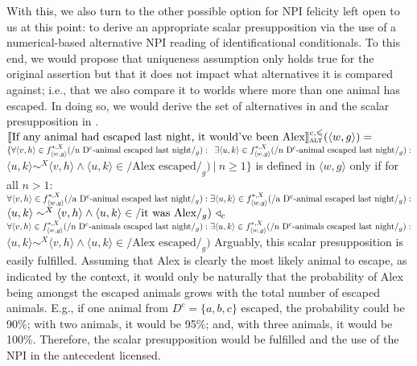 With this, we also turn to the other possible option for NPI felicity left open to us at this point: to derive an appropriate scalar presupposition via the use of a numerical-based alternative NPI reading of identificational conditionals. To this end, we would propose that  uniqueness assumption only holds true for the original assertion but that it does not impact what alternatives it is compared against; i.e., that we also compare it to worlds where more than one animal has escaped. In doing so, we would derive the set of alternatives in  and the scalar presupposition in .
\ex
$\intension[c,\leqslant]{If any animal had escaped last night, it would've been Alex}_\text{\scshape alt}(\langle w,g\rangle)=$\\$\{\forall{\langle v,h\rangle\in f^{*,X}_{\langle w,g\rangle}(/\text{n D\textsuperscript{c}-animal escaped last night}/_g)}:\\\phantom{\{}\exists\langle u,k\rangle\in f^{*,X}_{\langle w,g\rangle}(/\text{n D\textsuperscript{c}-animal escaped last night}/_g):$\\\emptyfill$\langle u,k\rangle\sim^X\langle v,h\rangle\land\langle u,k\rangle\in/\text{Alex escaped}/_g)~|~n\geqslant1\}$
\xe
\ex
{}\linebreak
is defined in $\langle w,g\rangle$ only if for all $n>1$:\\
$\forall{\langle v,h\rangle\in f^{*,X}_{\langle w,g\rangle}(/\text{a D\textsuperscript{c}-animal escaped last night}/_g)}:\\\exists\langle u,k\rangle\in f^{*,X}_{\langle w,g\rangle}(/\text{a D\textsuperscript{c}-animal escaped last night}/_g):$\\\emptyfill$\langle u,k\rangle\sim^X\langle v,h\rangle\land\langle u,k\rangle\in/\text{it was Alex}/_g)~\lprob_c$\\
$\forall{\langle v,h\rangle\in f^{*,X}_{\langle w,g\rangle}(/\text{n D\textsuperscript{c}-animals escaped last night}/_g)}:\\\exists\langle u,k\rangle\in f^{*,X}_{\langle w,g\rangle}(/\text{n D\textsuperscript{c}-animals escaped last night}/_g):$\\\emptyfill$\langle u,k\rangle\sim^X\langle v,h\rangle\land\langle u,k\rangle\in/\text{Alex escaped}/_g)$
\xe
Arguably, this scalar presupposition is easily fulfilled. Assuming that Alex is clearly the most likely animal to escape, as indicated by the context, it would only be naturally that the probability of Alex being amongst the escaped animals grows with the total number of escaped animals. E.g., if one animal from $D^c=\{a,b,c\}$ escaped, the probability could be 90\%; with two animals, it would be 95\%; and, with three animals, it would be 100\%. Therefore, the scalar presupposition would be fulfilled and the use of the NPI in the antecedent licensed.

